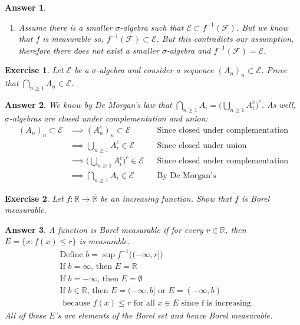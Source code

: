 \documentclass[12pt]{article}
\theoremstyle{colon}
\newtheorem{exercise}{Exercise}
\newtheorem*{answer}{Answer}
\begin{document}
\begin{answer}
\begin{enumerate}[label=(\roman*)]
      \item Assume there is a smaller $\sigma$-algebra such that $\mathcal{E} \subset f^{-1}(\mathcal{F})$. But we know that $f$ is measurable so, $f^{-1}(\mathcal{F}) \subset \mathcal{E}$. But this contradicts our assumption, therefore there does not exist a smaller $\sigma$-algebra and $f^{-1}(\mathcal{F}) = \mathcal{E}$.
  \end{enumerate}
\end{answer}

\clearpage

\begin{exercise}
  Let $\mathcal{E}$ be a $\sigma$-algebra and consider a sequence $(A_n)_n \subset \mathcal{E}$. Prove that $\bigcap\limits_{n \geq 1} A_n \in \mathcal{E}$.
\end{exercise}

\begin{answer}
  We know by De Morgan's law that $\bigcap\limits_{n \geq 1} A_i = \Big( \bigcup\limits_{n \geq 1} A_i^c \Big)^c$. As well, $\sigma$-algebras are closed under complementation and union:
  \begin{align*}
      (A_n)_n \subset \mathcal{E} &\implies (A_n^c)_n \subset \mathcal{E} && \text{Since closed under complementation}\\
      &\implies \bigcup\limits_{n \geq 1} A_i^c \in \mathcal{E} && \text{Since closed under union} \\
      &\implies \Big( \bigcup\limits_{n \geq 1} A_i^c \Big)^c \in \mathcal{E} && \text{Since closed under complementation} \\
      &\implies \bigcap\limits_{n \geq 1} A_i \in \mathcal{E}  && \text{By De Morgan's}
  \end{align*}
\end{answer}

\clearpage

\begin{exercise}
  Let $f: \mathbb{R} \rightarrow \overline{\mathbb{R}}$ be an increasing function. Show that $f$ is Borel measurable.
\end{exercise}

\begin{answer}
  A function is Borel measurable if for every $r \in \mathbb{R}$, then $E = \{ x: f(x) \leq r\}$ is measurable.
  \begin{align*}
    &\text{Define } b = \sup f^{-1}\big((-\infty, r]\big) \\
    &\text{If } b = \infty \text{, then } E = \mathbb{R} \\
    &\text{If } b = -\infty \text{, then } E = \emptyset \\
    &\text{If } b \in \mathbb{R} \text{, then } E = (-\infty, b] \text{ or } E = (-\infty, b) \\
    &\text{ because } f(x) \leq r \text{ for all } x \in E \text{ since f is increasing.}
  \end{align*}
  All of these $E$'s are elements of the Borel set and hence Borel measurable.
\end{answer}
\end{document}
